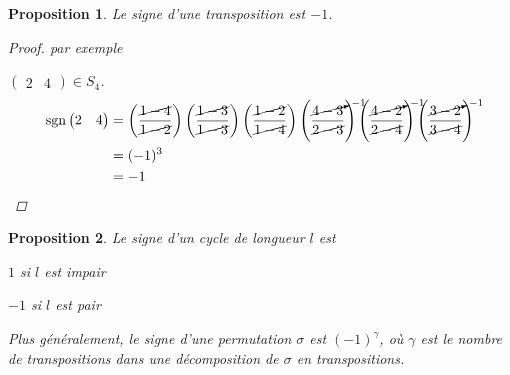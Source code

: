 \documentclass{report}
\newtheorem*{prop}{Proposition}
\theoremstyle{definition}
\theoremstyle{remark}
\begin{document}
	\begin{prop}
		Le signe d'une transposition est $-1$.
		\begin{proof}
			par exemple

			$\begin{pmatrix}
				2&4
			\end{pmatrix} \in S_4$.
			\begin{align*}
				\mathrm{sgn}\begin{pmatrix}
					2&4
				\end{pmatrix}&= \left( \dfrac{\cancel{1-4}}{\cancel{1-2}} \right) \left( \dfrac{\cancel{1-3}}{\cancel{1-3}} \right) \left( \dfrac{\cancel{1-2}}{\cancel{1-4}} \right) \left( \dfrac{\cancelto{-1}{4-3}}{\cancel{2-3}} \right) \left( \dfrac{\cancelto{-1}{4-2}}{\cancel{2-4}} \right) \left( \dfrac{\cancelto{-1}{3-2}}{\cancel{3-4}} \right)\\
				&= (-1)^3\\
				&= -1
			\end{align*}
			\renewcommand{\qedsymbol}{\#}
		\end{proof}
		\renewcommand{\qedsymbol}{$\square$}
	\end{prop}
	\begin{prop}
		Le signe d'un cycle de longueur $l$ est
		\begin{ulist}
			\item $1$ si $l$ est impair
			\item $-1$ si $l$ est pair
		\end{ulist}

		Plus g\'en\'eralement, le signe d'une permutation $\sigma$ est $(-1)^\gamma$, o\`u $\gamma$ est le nombre de transpositions dans \emph{une} d\'ecomposition de $\sigma$ en transpositions.
	\end{prop}
\end{document}
